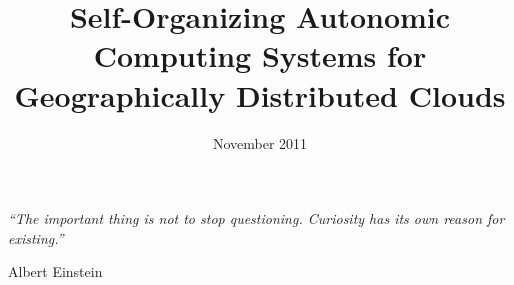 \documentclass[a4paper, 12pt, oneside]{Thesis}  %
\numberwithin{algorithm}{chapter}
\begin{document}
\setlength{\headheight}{27.5pt}\textsl{}
\frontmatter	  %

\title  {Self-Organizing Autonomic Computing Systems for Geographically Distributed Clouds}
\addresses  {\groupname\\\deptname\\\univname}  %
\date       {November 2011}
\subject    {}
\keywords   {}

\maketitle


\fancyhead{}  %
\rhead{\thepage}  %
\lhead{}  %

\pagestyle{fancy}  %

\pagestyle{empty}  %

\null\vfill
\textit{``The important thing is not to stop questioning. Curiosity has its own reason for existing.''}

\begin{flushright}
Albert Einstein
\end{flushright}

\vfill\vfill\vfill\vfill\vfill\vfill\null
\clearpage  %
\end{document}
